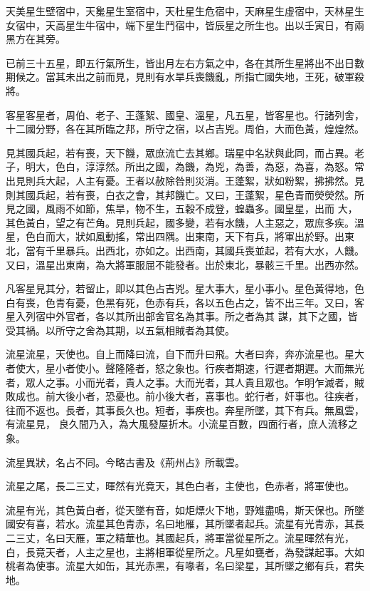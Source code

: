 \begin{pinyinscope}
 天美星生壁宿中，天毚星生室宿中，天杜星生危宿中，天麻星生虛宿中，天林星生女宿中，天高星生牛宿中，端下星生鬥宿中，皆辰星之所生也。出以壬寅日，有兩黑方在其旁。



 已前三十五星，即五行氣所生，皆出月左右方氣之中，各在其所生星將出不出日數期候之。當其未出之前而見，見則有水旱兵喪饑亂，所指亡國失地，王死，破軍殺將。



 客星客星者，周伯、老子、王蓬絮、國皇、溫星，凡五星，皆客星也。行諸列舍，十二國分野，各在其所臨之邦，所守之宿，以占吉兇。周伯，大而色黃，煌煌然。



 見其國兵起，若有喪，天下饑，眾庶流亡去其鄉。瑞星中名狀與此同，而占異。老子，明大，色白，淳淳然。所出之國，為饑，為兇，為善，為惡，為喜，為怒。常出見則兵大起，人主有憂。王者以赦除咎則災消。王蓬絮，狀如粉絮，拂拂然。見則其國兵起，若有喪，白衣之會，其邦饑亡。又曰，王蓬絮，星色青而熒熒然。所見之國，風雨不如節，焦旱，物不生，五穀不成登，蝗蟲多。國皇星，出而
 大，其色黃白，望之有芒角。見則兵起，國多變，若有水饑，人主惡之，眾庶多疾。溫星，色白而大，狀如風動搖，常出四隅。出東南，天下有兵，將軍出於野。出東北，當有千里暴兵。出西北，亦如之。出西南，其國兵喪並起，若有大水，人饑。又曰，溫星出東南，為大將軍服屈不能發者。出於東北，暴骸三千里。出西亦然。



 凡客星見其分，若留止，即以其色占吉兇。星大事大，星小事小。星色黃得地，色白有喪，色青有憂，色黑有死，色赤有兵，各以五色占之，皆不出三年。又曰，客星入列宿中外官者，各以其所出部舍官名為其事。所之者為其
 謀，其下之國，皆受其禍。以所守之舍為其期，以五氣相賊者為其使。



 流星流星，天使也。自上而降曰流，自下而升曰飛。大者曰奔，奔亦流星也。星大者使大，星小者使小。聲隆隆者，怒之象也。行疾者期速，行遲者期遲。大而無光者，眾人之事。小而光者，貴人之事。大而光者，其人貴且眾也。乍明乍滅者，賊敗成也。前大後小者，恐憂也。前小後大者，喜事也。蛇行者，奸事也。往疾者，往而不返也。長者，其事長久也。短者，事疾也。奔星所墜，其下有兵。無風雲，有流星見，
 良久間乃入，為大風發屋折木。小流星百數，四面行者，庶人流移之象。



 流星異狀，名占不同。今略古書及《荊州占》所載雲。



 流星之尾，長二三丈，暉然有光竟天，其色白者，主使也，色赤者，將軍使也。



 流星有光，其色黃白者，從天墜有音，如炬熛火下地，野雉盡鳴，斯天保也。所墜國安有喜，若水。流星其色青赤，名曰地雁，其所墜者起兵。流星有光青赤，其長二三丈，名曰天雁，軍之精華也。其國起兵，將軍當從星所之。流星暉然有光，白，長竟天者，人主之星也，主將相軍從星所之。凡星如甕者，為發謀起事。大如
 桃者為使事。流星大如缶，其光赤黑，有喙者，名曰梁星，其所墜之鄉有兵，君失地。




\end{pinyinscope}
